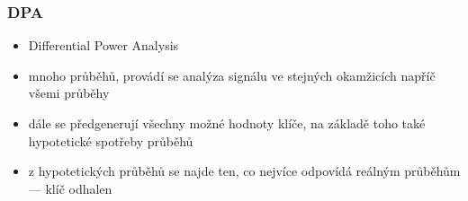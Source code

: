 \subsubsection*{DPA}
\begin{itemize}
	\item Differential Power Analysis
	\item mnoho průběhů, provádí se analýza signálu ve stejných okamžicích napříč všemi průběhy
	\item dále se předgenerují všechny možné hodnoty klíče, na základě toho také hypotetické spotřeby průběhů
	\item z hypotetických průběhů se najde ten, co nejvíce odpovídá reálným průběhům --- klíč odhalen
\end{itemize}
